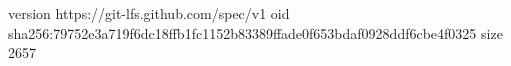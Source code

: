 version https://git-lfs.github.com/spec/v1
oid sha256:79752e3a719f6dc18ffb1fc1152b83389ffade0f653bdaf0928ddf6cbe4f0325
size 2657
